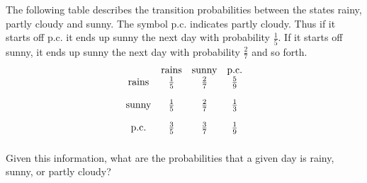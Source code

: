 \begin{enumialphparenastyle}
\begin{ex} The following table describes the transition probabilities between the
states rainy, partly cloudy and sunny. The symbol p.c. indicates partly
cloudy. Thus if it starts off p.c. it ends up sunny the next day with
probability $\frac{1}{5}$. If it starts off sunny, it ends up sunny the next
day with probability $\frac{2}{7}$ and so forth.
\begin{equation*}
\begin{array}{cccc}
& \text{rains} & \text{sunny} & \text{p.c.} \\
\text{rains} & \vspace{0.05in}\frac{1}{5} & \vspace{0.05in}\frac{2}{7} & \vspace{0.05in}\frac{5}{9} \\
\text{sunny} & \vspace{0.05in}\frac{1}{5} & \vspace{0.05in}\frac{2}{7} & \vspace{0.05in}\frac{1}{3} \\
\text{p.c.} & \vspace{0.05in}\frac{3}{5} & \vspace{0.05in}\frac{3}{7} & \vspace{0.05in}\frac{1}{9}
\end{array}
\end{equation*}
Given this information, what are the probabilities that a given day is
rainy, sunny, or partly cloudy?
\end{ex}

\end{enumialphparenastyle}
